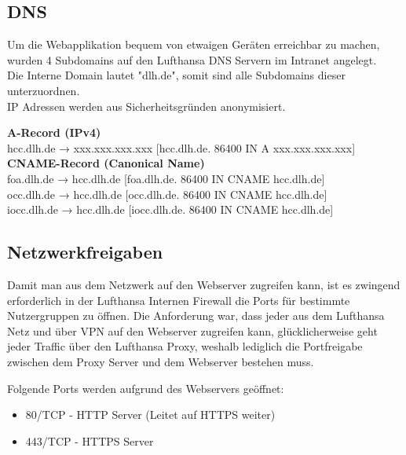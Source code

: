 	\subsubsection{}


	\subsection{DNS}
	Um die Webapplikation bequem von etwaigen Geräten erreichbar zu machen, wurden 4 Subdomains auf den Lufthansa DNS Servern im Intranet angelegt.\\
	Die Interne Domain lautet "dlh.de", somit sind alle Subdomains dieser unterzuordnen. \\

	IP Adressen werden aus Sicherheitsgründen anonymisiert.

	\vspace{16pt}

	\textbf{A-Record (IPv4)}\\
	hcc.dlh.de → xxx.xxx.xxx.xxx [hcc.dlh.de. 86400 IN A xxx.xxx.xxx.xxx]\\

	\textbf{CNAME-Record (Canonical Name)}\\
	foa.dlh.de → hcc.dlh.de [foa.dlh.de. 86400 IN CNAME hcc.dlh.de]\\
	occ.dlh.de → hcc.dlh.de [occ.dlh.de. 86400 IN CNAME hcc.dlh.de]\\
	iocc.dlh.de → hcc.dlh.de [iocc.dlh.de. 86400 IN CNAME hcc.dlh.de]\\

	\subsection{Netzwerkfreigaben}
	Damit man aus dem Netzwerk auf den Webserver zugreifen kann, ist es zwingend erforderlich in der Lufthansa Internen Firewall die Ports für bestimmte Nutzergruppen zu öffnen.
	Die Anforderung war, dass jeder aus dem Lufthansa Netz und über VPN auf den Webserver zugreifen kann, glücklicherweise geht jeder Traffic über den Lufthansa Proxy, weshalb lediglich die Portfreigabe zwischen dem Proxy Server und dem Webserver bestehen muss.
	
	Folgende Ports werden aufgrund des Webservers geöffnet:

	\begin{itemize}
		\item 80/TCP - HTTP Server (Leitet auf HTTPS weiter)
		\item 443/TCP - HTTPS Server
	\end{itemize}